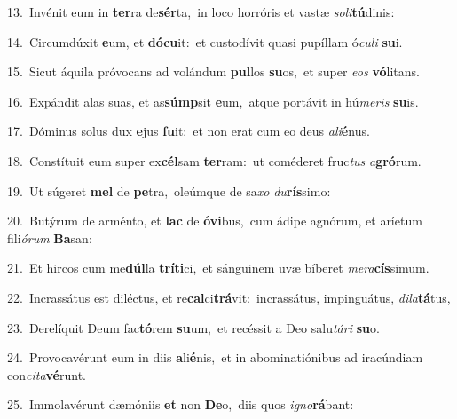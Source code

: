 {\numbfont\textcolor{\numbcolor}{13.}}~Invénit eum in \textbf{ter}\-ra de\-\textbf{sér}\-ta,~\star in loco horróris et vastæ \textit{so}\-\textit{li}\textbf{tú}dinis:\par
{\numbfont\textcolor{\numbcolor}{14.}}~Circumdúxit \textbf{e}\-um, et \textbf{dó}\-\textbf{cu}it:~\star et custodívit quasi pupíllam ó\-\textit{cu}\-\textit{li} \textbf{su}\-i.\par
{\numbfont\textcolor{\numbcolor}{15.}}~Sicut áquila próvocans ad volándum \textbf{pul}\-los \textbf{su}\-os,~\star et super \textit{e}\-\textit{os} \textbf{vó}\-litans.\par
{\numbfont\textcolor{\numbcolor}{16.}}~Expándit alas suas, et as\-\textbf{súmp}\-sit \textbf{e}\-um,~\star atque portávit in hú\-\textit{me}\-\textit{ris} \textbf{su}\-is.\par
{\numbfont\textcolor{\numbcolor}{17.}}~Dóminus solus dux \textbf{e}\-jus \textbf{fu}\-it:~\star et non erat cum eo deus \textit{a}\-\textit{li}\textbf{é}nus.\par
{\numbfont\textcolor{\numbcolor}{18.}}~Constítuit eum super ex\-\textbf{cél}\-sam \textbf{ter}\-ram:~\star ut coméderet fruc\textit{tus} \textit{a}\-\textbf{gró}rum.\par
{\numbfont\textcolor{\numbcolor}{19.}}~Ut súgeret \textbf{mel} de \textbf{pe}\-tra,~\star oleúmque de sa\textit{xo} \textit{du}\-\textbf{rís}simo:\par
{\numbfont\textcolor{\numbcolor}{20.}}~Butýrum de arménto, et \textbf{lac} de \textbf{ó}\-\textbf{vi}bus,~\star cum ádipe agnórum, et aríetum fili\-\textit{ó}\-\textit{rum} \textbf{Ba}\-san:\par
{\numbfont\textcolor{\numbcolor}{21.}}~Et hircos cum me\-\textbf{dúl}\-la \textbf{trí}\-\textbf{ti}ci,~\star et sánguinem uvæ bíberet \textit{me}\-\textit{ra}\textbf{cís}simum.\par
{\numbfont\textcolor{\numbcolor}{22.}}~Incrassátus est diléctus, et re\-\textbf{cal}\-ci\-\textbf{trá}\-vit:~\star incrassátus, impinguátus, \textit{di}\-\textit{la}\textbf{tá}tus,\par
{\numbfont\textcolor{\numbcolor}{23.}}~Derelíquit Deum fac\-\textbf{tó}\-rem \textbf{su}\-um,~\star et recéssit a Deo salu\-\textit{tá}\-\textit{ri} \textbf{su}\-o.\par
{\numbfont\textcolor{\numbcolor}{24.}}~Provocavérunt eum in diis \textbf{a}\-li\-\textbf{é}\-nis,~\star et in abominatiónibus ad iracúndiam con\-\textit{ci}\-\textit{ta}\textbf{vé}runt.\par
{\numbfont\textcolor{\numbcolor}{25.}}~Immolavérunt dæmóniis \textbf{et} non \textbf{De}\-o,~\star diis quos \textit{i}\-\textit{gno}\textbf{rá}bant:\par
